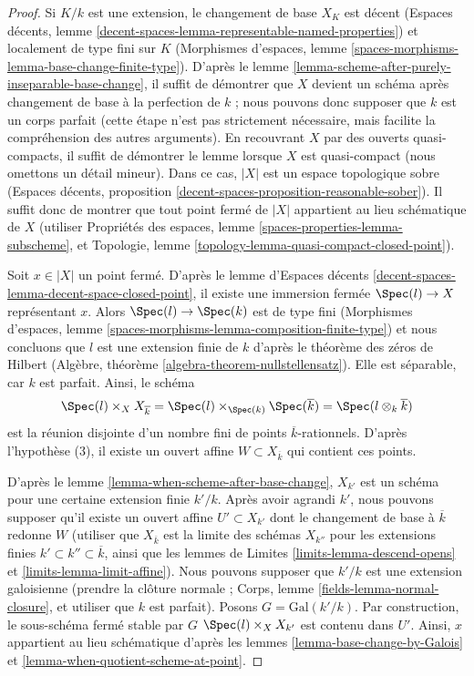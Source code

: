 \begin{proof}
Si $K/k$ est une extension, le changement de base $X_K$ est
décent (Espaces décents, lemme
\ref{decent-spaces-lemma-representable-named-properties})
et localement de type fini
sur $K$ (Morphismes d'espaces, lemme
\ref{spaces-morphisms-lemma-base-change-finite-type}).
D'après le lemme \ref{lemma-scheme-after-purely-inseparable-base-change},
il suffit de démontrer que $X$ devient un schéma après changement de base à
la perfection de $k$ ; nous pouvons donc supposer que $k$ est un corps parfait
(cette étape n'est pas strictement nécessaire, mais facilite
la compréhension des autres arguments).
En recouvrant $X$ par des ouverts quasi-compacts, il suffit de démontrer
le lemme lorsque $X$ est quasi-compact (nous omettons un détail mineur).
Dans ce cas, $|X|$ est un espace topologique sobre
(Espaces décents, proposition
\ref{decent-spaces-proposition-reasonable-sober}).
Il suffit donc de montrer que tout point fermé de $|X|$
appartient au lieu schématique de $X$
(utiliser Propriétés des espaces, lemme \ref{spaces-properties-lemma-subscheme}, et
Topologie, lemme \ref{topology-lemma-quasi-compact-closed-point}).

\medskip\noindent
Soit $x \in |X|$ un point fermé. D'après le lemme d'Espaces décents
\ref{decent-spaces-lemma-decent-space-closed-point},
il existe une immersion fermée $\Spec(l) \to X$ représentant $x$.
Alors $\Spec(l) \to \Spec(k)$ est de type fini (Morphismes d'espaces,
lemme \ref{spaces-morphisms-lemma-composition-finite-type}) et nous
concluons que $l$ est une extension finie de $k$
d'après le théorème des zéros de Hilbert (Algèbre, théorème
\ref{algebra-theorem-nullstellensatz}). Elle est séparable, car
$k$ est parfait. Ainsi, le schéma
$$
\Spec(l) \times_X X_{\overline{k}} =
\Spec(l) \times_{\Spec(k)} \Spec(\overline{k}) =
\Spec(l \otimes_k \overline{k})
$$
est la réunion disjointe d'un nombre fini de points $\overline{k}$-rationnels.
D'après l'hypothèse (3), il existe un ouvert affine $W \subset X_{\overline{k}}$
qui contient ces points.

\medskip\noindent
D'après le lemme \ref{lemma-when-scheme-after-base-change}, $X_{k'}$
est un schéma pour une certaine extension finie $k'/k$. Après avoir agrandi
$k'$, nous pouvons supposer qu'il existe un ouvert affine $U' \subset X_{k'}$
dont le changement de base à $\overline{k}$ redonne $W$
(utiliser que $X_{\overline{k}}$ est la limite des schémas $X_{k''}$
pour les extensions finies $k' \subset k'' \subset \overline{k}$, ainsi que les
lemmes de Limites \ref{limits-lemma-descend-opens} et
\ref{limits-lemma-limit-affine}). Nous pouvons supposer
que $k'/k$ est une extension galoisienne (prendre la clôture normale ;
Corps, lemme \ref{fields-lemma-normal-closure}, et utiliser
que $k$ est parfait). Posons $G = \text{Gal}(k'/k)$.
Par construction, le sous-schéma fermé stable par $G$
$\Spec(l) \times_X X_{k'}$ est contenu dans $U'$.
Ainsi, $x$ appartient au lieu schématique d'après les
lemmes \ref{lemma-base-change-by-Galois} et
\ref{lemma-when-quotient-scheme-at-point}.
\end{proof}


